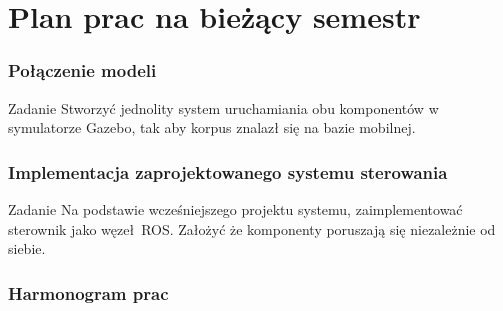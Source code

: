 \section{Plan prac na bieżący semestr}

\begin{frame}
	\frametitle{Połączenie modeli}
	\begin{block}{Zadanie}
	Stworzyć jednolity system uruchamiania obu komponentów w symulatorze
	Gazebo, tak aby korpus znalazł się na bazie mobilnej.
	\end{block}
\end{frame}


\begin{frame}
	\frametitle{Implementacja zaprojektowanego systemu sterowania}
	\begin{block}{Zadanie}
	Na podstawie wcześniejszego projektu systemu, zaimplementować 
	sterownik jako węzeł ROS. Założyć że komponenty poruszają się 
	niezależnie od siebie.
	\end{block}
\end{frame}


\begin{frame}
	\frametitle{Harmonogram prac}
	\centering
	\begin{ganttchart}{1}{18}
		 \ganttnewline
		 \ganttnewline
		 \ganttnewline
		 \ganttnewline
		   \ganttnewline
		  
		\end{ganttchart}
\end{frame}

